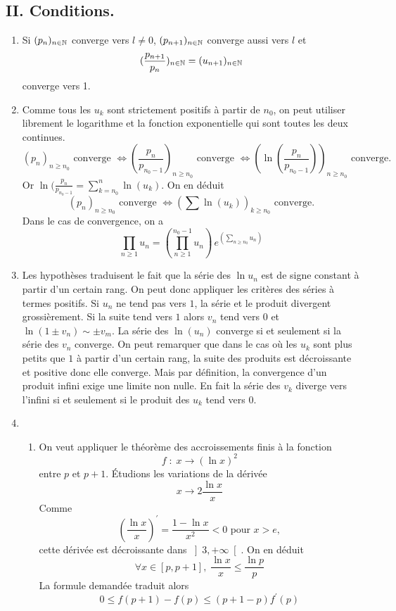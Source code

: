 \subsection*{II. Conditions.}
\begin{enumerate}
 \item  Si $(p_{n})_{n\in \mathbb{N}}$ converge vers $l\neq 0$, $(p_{n+1})_{n\in \mathbb{N}}$ converge aussi vers $l$ et \[(\frac{p_{n+1}}{p_{n}})_{n\in \mathbb{N}}=(u_{n+1})_{n\in \mathbb{N}}\] 
converge vers 1.

 \item Comme tous les $u_k$ sont strictement positifs à partir de $n_0$, on peut utiliser librement le logarithme et la fonction exponentielle qui sont toutes les deux continues.
\[
 (p_{n})_{n \geq n_0} \text{ converge } \Leftrightarrow (\frac{p_{n}}{p_{n_0-1}})_{n \geq n_0} \text{ converge } \Leftrightarrow (\ln(\frac{p_{n}}{p_{n_0-1}}))_{n \geq n_0} \text{ converge. }
\]
Or $\ln(\frac{p_{n}}{p_{n_0-1}} = \sum_{k=n_0}^{n}\ln(u_k)$. On en déduit
\[
 (p_{n})_{n \geq n_0} \text{ converge } \Leftrightarrow \left( \sum \ln(u_k) \right)_{k \geq n_0} \text{ converge.} 
\]
Dans le cas de convergence, on a
\[
 \prod_{n\geq 1} u_n = \left( \prod_{n\geq 1}^{n_0 -1} u_n\right)\, e^{\left( \sum_{n \geq n_0} u_n\right) } 
\]

 \item Les hypothèses traduisent le fait que la série des $\ln u_n$ est de signe constant à partir d'un certain rang. On peut donc appliquer les critères des séries à termes positifs. Si $u_n$ ne tend pas vers $1$, la série et le produit divergent grossièrement. Si la suite tend vers $1$ alors $v_n$ tend vers $0$ et $\ln(1\pm v_n)\sim \pm v_m$. La série des $\ln(u_n)$ converge si et seulement si la série des $v_n$ converge.\newline
 On peut remarquer que dans le cas où les $u_k$ sont plus petits que $1$ à partir d'un certain rang, la suite des produits est décroissante et positive donc elle converge. Mais par définition, la convergence d'un produit infini exige une limite non nulle. En fait la série des $v_k$ diverge vers l'infini si et seulement si le produit des $u_k$ tend vers $0$. 
 \item
\begin{enumerate}
  \item  On veut appliquer le théorème des accroissements finis à la fonction
\[f\; : \; x \rightarrow (\ln x )^2\]
entre $p$ et $p+1$. \'Etudions les variations de la dérivée 
\[x\rightarrow 2\frac{\ln x}{x}\]
Comme
\[
\left( \frac{\ln x}{x}\right) ^{\prime }=\frac{1-\ln x}{x^{2}} < 0 \text{ pour } x > e,
\]
cette dérivée est décroissante dans $\left] 3,+\infty \right[ $. On en d\'{e}duit 
\[
\forall x\in \left[ p,p+1\right], \; \frac{\ln x}{x}\leq \frac{\ln p}{p}
\]
La formule demand\'{e}e traduit alors
\[0\leq f(p+1)-f(p)\leq (p+1 -p)f^\prime(p)\]


\end{enumerate}
\end{enumerate}
